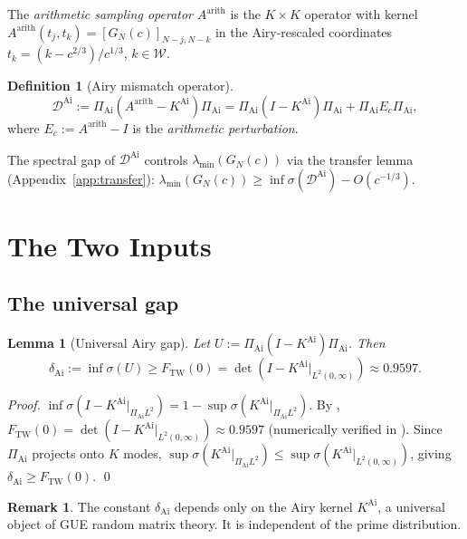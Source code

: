 \documentclass[12pt,a4paper]{amsart}
\newtheorem{lemma}[theorem]{Lemma}
\theoremstyle{definition}
\newtheorem{definition}[theorem]{Definition}
\newtheorem{remark}[theorem]{Remark}
\newcommand{\KAi}{K^{\mathrm{Ai}}}
\newcommand{\DAi}{\mathcal{D}^{\mathrm{Ai}}}
\newcommand{\PAi}{\Pi_{\mathrm{Ai}}}
\newcommand{\GN}{G_N(c)}
\newcommand{\Ec}{E_c}
\newcommand{\spec}{\sigma}
\newcommand{\FTW}{F_{\mathrm{TW}}(0)}
\newcommand{\dAi}{\delta_{\mathrm{Ai}}}
\begin{document}
The \emph{arithmetic sampling operator} $A^{\mathrm{arith}}$ is the
$K\times K$ operator with kernel
$A^{\mathrm{arith}}(t_j,t_k) = [\GN]_{N-j,N-k}$
in the Airy-rescaled coordinates $t_k = (k - c^{2/3})/c^{1/3}$, $k \in \mathcal{W}$.

\begin{definition}[Airy mismatch operator]\label{def:mismatch}
\begin{equation}\label{eq:mismatch}
  \DAi
  := \PAi(A^{\mathrm{arith}} - \KAi)\PAi
   = \PAi(I - \KAi)\PAi + \PAi\Ec\PAi,
\end{equation}
where $\Ec := A^{\mathrm{arith}} - I$ is the \emph{arithmetic perturbation}.
\end{definition}

The spectral gap of $\DAi$ controls $\lambda_{\min}(\GN)$ via the
transfer lemma (Appendix~\ref{app:transfer}):
$\lambda_{\min}(\GN) \ge \inf\spec(\DAi) - O(c^{-1/3})$.

\section{The Two Inputs}
\label{sec:inputs}

\subsection{The universal gap}

\begin{lemma}[Universal Airy gap]\label{lem:tw}
Let $U := \PAi(I - \KAi)\PAi$. Then
\begin{equation}\label{eq:tw}
  \dAi := \inf\spec(U)
  \ge \FTW = \det(I - \KAi|_{L^2(0,\infty)})
  \approx 0.9597.
\end{equation}
\end{lemma}

\begin{proof}
$\inf\spec(I - \KAi|_{\PAi L^2}) = 1 - \sup\spec(\KAi|_{\PAi L^2})$.
By \cite{TW1994}, $\FTW = \det(I - \KAi|_{L^2(0,\infty)}) \approx 0.9597$
(numerically verified in \cite{Bornemann2010}).
Since $\PAi$ projects onto $K$ modes,
$\sup\spec(\KAi|_{\PAi L^2}) \le \sup\spec(\KAi|_{L^2(0,\infty)})$,
giving $\dAi \ge \FTW$. \qed
\end{proof}

\begin{remark}
The constant $\dAi$ depends only on the Airy kernel $\KAi$,
a universal object of GUE random matrix theory.
It is independent of the prime distribution.
\end{remark}
\end{document}
